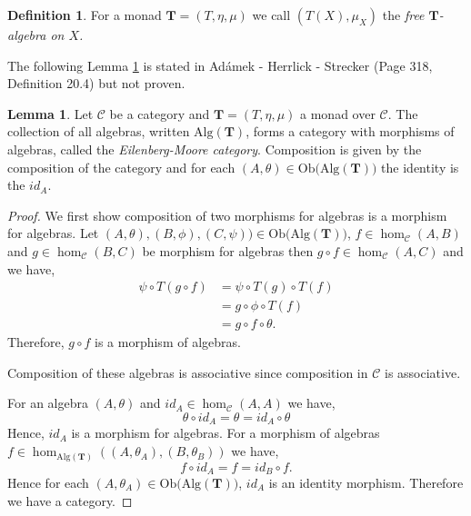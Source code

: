 \documentclass[11pt,a4paper]{article}
\theoremstyle{definition}
\newtheorem{lemma}[thm]{Lemma}
\newtheorem{definition}[thm]{Definition}
\newcommand\ho[3][]{\hom_{#1}(#2,#3)}
\newcommand\ob[1]{\mathrm{Ob(}#1\mathrm{)}}
\newcommand\cat[1]{\mathscr{#1}}
\newcommand{\alg}[1]{\mathrm{Alg}(\mathbf{#1})}
\numberwithin{equation}{section}
\begin{document}
\begin{definition}
    \label{def:muisalg}
    For a monad $\mathbf{T} = (T,\eta,\mu)$ we call $(T(X), \mu_{X})$ the \emph{free $\mathbf{T}$-algebra on $X$.} 
\end{definition}

The following Lemma \ref{lem:monalgcat} is stated in Adámek - Herrlick - Strecker \cite{ACC} (Page 318, Definition 20.4) but not proven.
\begin{lemma}
    \label{lem:monalgcat}
    Let $\cat{C}$ be a category and $\mathbf{T}= (T,\eta,\mu)$ a monad over $\cat{C}$. The collection of all algebras, written $\alg{T}$, forms a category with morphisms of algebras, called the \emph{Eilenberg-Moore category}. Composition is given by the composition of the category and for each $(A,\theta)\in\ob{\alg{T}}$ the identity is the $id_{A}$.
\end{lemma}
\begin{proof}
    We first show composition of two morphisms for algebras is a morphism for algebras. Let $(A,\theta),(B,\phi),(C,\psi))\in\ob{\alg{T}}$, $f\in\ho[\cat{C}]{A}{B}$ and $g\in\ho[\cat{C}]{B}{C}$ be morphism for algebras then $g\circ f\in\ho[\cat{C}]{A}{C}$ and we have,
    \begin{align*}
        \psi \circ T(g\circ f) &= \psi \circ T(g) \circ T(f)\\
        &= g \circ \phi \circ T(f)\\
        &= g\circ  f \circ \theta.
    \end{align*}
    Therefore, $g\circ f$ is a morphism of algebras. 
    
    Composition of these algebras is associative since composition in $\cat{C}$ is associative. 
    
    For an algebra $(A,\theta)$ and $id_{A}\in\ho[\cat{C}]{A}{A}$ we have,
    \[\theta \circ id_{A} = \theta = id_{A} \circ \theta\]
    Hence, $id_{A}$ is a morphism for algebras. For a morphism of algebras $f\in\ho[\alg{T}]{(A,\theta_A)}{(B,\theta_B)}$ we have,
    \[f\circ id_{A} = f = id_{B} \circ f.\]
    Hence for each $(A,\theta_A)\in\ob{\alg{T}}$, $id_{A}$ is an identity morphism. Therefore we have a category.
\end{proof}



\end{document}
